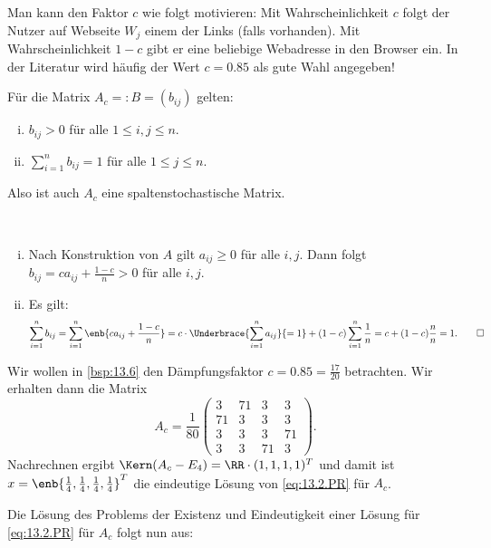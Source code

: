 Man kann den Faktor $c$ wie folgt motivieren:
Mit Wahrscheinlichkeit $c$ folgt der Nutzer auf Webseite $W_j$ einem der Links (falls vorhanden).
Mit Wahrscheinlichkeit $1-c$ gibt er eine beliebige Webadresse in den Browser ein.
In der Literatur wird häufig der Wert $c = 0.85$ als gute Wahl angegeben!

\begin{lemma}
	\label{lemma:13.8}
	Für die Matrix $A_c =: B = (b_{ij})$ gelten:
	\begin{enumerate}[(i)]
		\item $b_{ij} > 0$ für alle $1 \leq i,j \leq n$.
		\item $\sum_{i=1}^{n} b_{ij} = 1$ für alle $1 \leq j \leq n$.
	\end{enumerate}
	Also ist auch $A_c$ eine spaltenstochastische Matrix.
\end{lemma}

\begin{beweis}
	\mbox{} \\[-.9cm]
	\begin{enumerate}[(i)]
		\item Nach Konstruktion von $A$ gilt $a_{ij} \geq 0$ für alle $i,j$.
		Dann folgt $b_{ij} = ca_{ij} + \frac{1-c}{n} > 0$ für alle $i,j$.
		\item Es gilt: 
		\[
			\sum_{i=1}^{n} b_{ij} = \sum_{i=1}^{n} \enb{ca_{ij} + \frac{1-c}{n}} = c \cdot \Underbrace{\sum_{i=1}^{n} a_{ij}}{=1} + (1-c) \sum_{i=1}^{n} \frac{1}{n} = c+(1-c) \frac{n}{n} = 1. \qedhere
		\]
	\end{enumerate}
	\qedhere
\end{beweis}

\begin{beispiel}
	\label{bsp:13.9}
	Wir wollen in \autoref{bsp:13.6} den Dämpfungsfaktor $c = 0.85 = \frac{17}{20}$ betrachten.
	Wir erhalten dann die Matrix
	\[
		A_c = \frac{1}{80} \begin{pmatrix}
			3  & 71 & 3  & 3  \\
			71 & 3  & 3  & 3  \\
			3  & 3  & 3  & 71 \\
			3  & 3  & 71 & 3
		\end{pmatrix}. 
	\]
	Nachrechnen ergibt $\Kern(A_c - E_4) = \RR \cdot (1,1,1,1)^T$ und damit ist $x = \enb{\frac{1}{4},\frac{1}{4},\frac{1}{4},\frac{1}{4}}^T$ die eindeutige Lösung von \eqref{eq:13.2.PR} für $A_c$.
\end{beispiel}

Die Lösung des Problems der Existenz und Eindeutigkeit einer Lösung für \eqref{eq:13.2.PR} für $A_c$ folgt nun aus:

